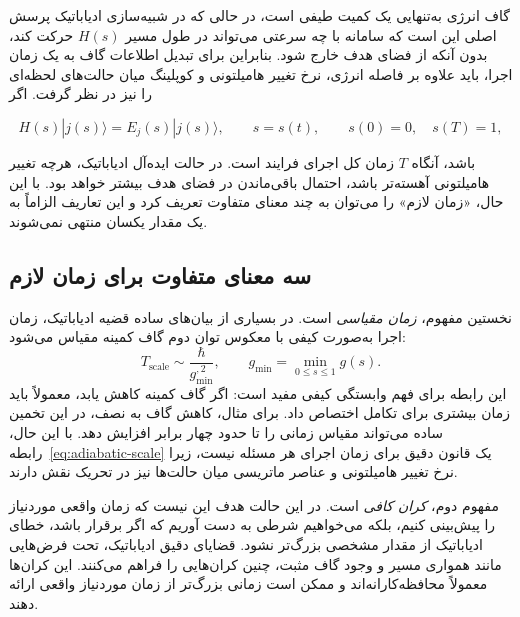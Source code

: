 گاف انرژی به‌تنهایی یک کمیت طیفی است، در حالی که در شبیه‌سازی
ادیاباتیک پرسش اصلی این است که سامانه با چه سرعتی می‌تواند در طول
مسیر $H(s)$ حرکت کند، بدون آنکه از فضای هدف خارج شود. بنابراین برای
تبدیل اطلاعات گاف به یک زمان اجرا، باید علاوه بر فاصله انرژی، نرخ
تغییر هامیلتونی و کوپلینگ میان حالت‌های لحظه‌ای را نیز در نظر گرفت.
اگر

$$
H(s)|j(s)\rangle=E_j(s)|j(s)\rangle,
\qquad
s=s(t),
\qquad
s(0)=0,\quad s(T)=1,
$$

باشد، آنگاه $T$ زمان کل اجرای فرایند است. در حالت ایده‌آل ادیاباتیک،
هرچه تغییر هامیلتونی آهسته‌تر باشد، احتمال باقی‌ماندن در فضای هدف
بیشتر خواهد بود. با این حال، «زمان لازم» را می‌توان به چند معنای
متفاوت تعریف کرد و این تعاریف الزاماً به یک مقدار یکسان منتهی
نمی‌شوند.

\subsection{سه معنای متفاوت برای زمان لازم}

نخستین مفهوم، \textit{زمان مقیاسی} است. در بسیاری از بیان‌های ساده
قضیه ادیاباتیک، زمان اجرا به‌صورت کیفی با معکوس توان دوم گاف کمینه
مقیاس می‌شود:
\begin{equation}
	T_{\mathrm{scale}}
	\sim
	\frac{\hbar}{g_{\min}^{,2}},
	\qquad
	g_{\min}=\min_{0\leq s\leq1}g(s).
	\label{eq:adiabatic-scale}
\end{equation}
این رابطه برای فهم وابستگی کیفی مفید است: اگر گاف کمینه کاهش یابد،
معمولاً باید زمان بیشتری برای تکامل اختصاص داد. برای مثال، کاهش گاف
به نصف، در این تخمین ساده می‌تواند مقیاس زمانی را تا حدود چهار برابر
افزایش دهد. با این حال، رابطه~\eqref{eq:adiabatic-scale} یک قانون
دقیق برای زمان اجرای هر مسئله نیست، زیرا نرخ تغییر هامیلتونی و
عناصر ماتریسی میان حالت‌ها نیز در تحریک نقش دارند.

مفهوم دوم، \textit{کران کافی} است. در این حالت هدف این نیست که زمان
واقعی موردنیاز را پیش‌بینی کنیم، بلکه می‌خواهیم شرطی به دست آوریم
که اگر برقرار باشد، خطای ادیاباتیک از مقدار مشخصی بزرگ‌تر نشود.
قضایای دقیق ادیاباتیک، تحت فرض‌هایی مانند همواری مسیر و وجود گاف
مثبت، چنین کران‌هایی را فراهم می‌کنند. این کران‌ها معمولاً
محافظه‌کارانه‌اند و ممکن است زمانی بزرگ‌تر از زمان موردنیاز واقعی
ارائه دهند.

